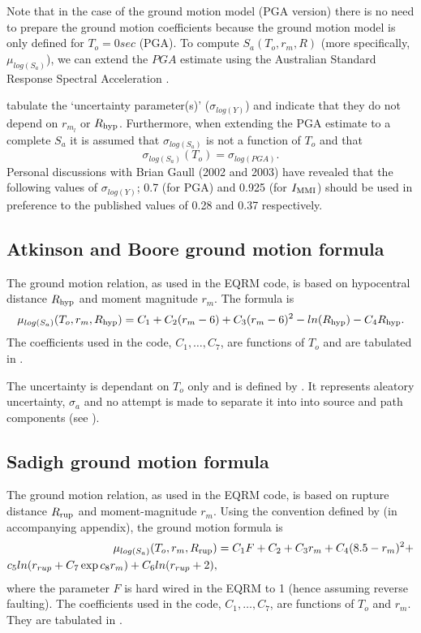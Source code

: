 Note that in the case of the \citet{dr_Gaull90a} ground motion model
(PGA version) there is no need to prepare the ground motion
coefficients because the ground motion model is only defined for
$T_o=0 sec$ (PGA). To compute $S_a(T_o,r_m,R)$ (more specifically,
$\mu_{log(S_a)}$), we can extend the $PGA$ estimate using the
Australian Standard Response Spectral Acceleration
\citep{dr_Standards93a}. 

\citet[Table 4]{dr_Gaull90a} tabulate the `uncertainty
parameter(s)' ($\sigma_{log(Y)}$) and indicate that they do not
depend on $r_{m_l}$ or $\Rhyp$. Furthermore, when extending the
PGA estimate to a complete $S_a$ it is assumed that
$\sigma_{log(S_a)}$ is not a function of $T_o$ and that
\begin{equation}
\sigma_{log(S_a)}(T_o) = \sigma_{log(PGA)}.
\end{equation}
Personal discussions with Brian Gaull (2002 and 2003) have
revealed that the following values of $\sigma_{log(Y)}$; 0.7 (for
PGA) and 0.925 (for $\Imm$) should be used in preference to the
published values of 0.28 and 0.37 respectively.


\subsection{Atkinson and Boore ground motion formula}

The \cite{dr_Atkinson97a} ground motion relation, as used in the
EQRM code, is based on hypocentral distance $\Rhyp$ and moment
magnitude $r_m$. The formula is
\begin{equation}
\mu_{log(S_a)}(T_o,r_m,\Rhyp) = C_1 + C_2(r_m-6) + C_3(r_m-6)^2
-ln(\Rhyp)-C_4\Rhyp.
\end{equation}
The coefficients used in the code, $C_1,\ldots,C_7$, are functions
of $T_o$ and are tabulated in \citet[Table 1]{dr_Atkinson97a}.

The uncertainty is dependant on $T_o$ only and is defined by
\citet{dr_Atkinson95b}. It represents aleatory uncertainty,
$\sigma_a$ and no attempt is made to separate it into into source
and path components (see \citealt[Table 2]{dr_Atkinson79a}).


\subsection{Sadigh ground motion formula}

The \cite{dr_Sadigh97a} ground motion relation, as used in the EQRM
code, is based on rupture distance $\Rrup$ and moment-magnitude
$r_m$. Using the convention defined by \citet{dr_Campbell03a} (in
accompanying appendix), the ground motion formula is
\begin{equation}
\begin{split}
\mu_{log(S_a)}(T_o,r_m,\Rrup) & = C_1F +C_2 + C_3r_m
+C_4(8.5-r_m)^2 + \\ c_5ln(r_{rup}+C_7\exp{c_8r_m}) +
C_6ln(r_{rup}+2),
\end{split}
\end{equation}
where the parameter $F$ is hard wired in the EQRM to 1 (hence
assuming reverse faulting). The coefficients used in the code,
$C_1,\ldots,C_7$, are functions of $T_o$ and $ r_m$. They are
tabulated in \citet[Table 2]{dr_Sadigh97a}.


